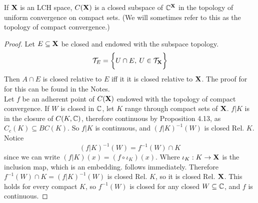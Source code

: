 \documentclass[../../main.tex]{subfiles}
\begin{document}
\begin{wts}
    If ${\mathbf{X}}$ is an LCH space, $C({\mathbf{X}})$ is a closed subspace of $\mathbb{C}^{\mathbf{X}}$ in the topology of uniform convergence on compact sets. (We will sometimes refer to this as the topology of compact convergence.)
\end{wts}
\begin{proof}
    Let $E\subseteq {\mathbf{X}}$ be closed and endowed with the subspace topology.
    \[
        \mathcal{T}_E = \biggl\{{U\cap E,\: U\in\mathcal{T}_{\mathbf{X}}}\biggr\}
    \]
    Then $A\cap E$ is closed relative to $E$ iff it it is closed relative to ${\mathbf{X}}$. The proof for for this can be found in the Notes.\\

    Let $f$ be an adherent point of $C({\mathbf{X}})$ endowed with the topology of compact convergence. If $W$ is closed in ${\mathbb{C}}$, let $K$ range through compact sets of ${\mathbf{X}}$. $f|K$ is in the closure of $C(K,{\mathbb{C}})$, therefore continuous by Proposition 4.13, as $C_c(K)\subseteq BC(K)$. So $f|K$ is continuous, and $(f|K)^{-1}(W)$ is closed Rel. $K$. Notice
    \begin{equation}\label{chp4:4.38-restriction-intersection}
            (f|K)^{-1}(W) = f^{-1}(W)\cap K    
    \end{equation}
    since we can write $(f|K)(x) = (f\circ \iota_K)(x)$. Where $\iota_K: K\to {\mathbf{X}}$ is the inclusion map, which is an embedding.  follows immediately. Therefore $f^{-1}(W)\cap K = (f|K)^{-1}(W)$ is closed Rel. $K$, so it is closed Rel. ${\mathbf{X}}$. This holds for every compact $K$, so $f^{-1}(W)$ is closed for any closed $W\subseteq{\mathbb{C}}$, and $f$ is continuous.
\end{proof}
\end{document}
